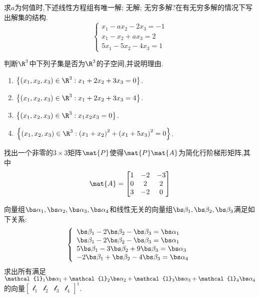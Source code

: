 \documentclass{ctexart}
\begin{document}
\pagestyle{empty}
\begin{center}
\end{center}
\begin{homework}[1(20')]
    求$a$为何值时,下述线性方程组有唯一解; 无解; 无穷多解?在有无穷多解的情况下写出解集的结构.
    \[\left\{\begin{array}{l}
        x_1-ax_2-2x_3=-1\\
        x_1-x_2+ax_3=2\\
        5x_1-5x_2-4x_3=1
    \end{array}\right.\]
\end{homework}
\begin{homework}[2(10')]
    判断$\R^3$中下列子集是否为$\R^3$的子空间,并说明理由.
    \begin{enumerate}[label=\tbf{(\arabic*)},topsep=0pt,parsep=0pt,itemsep=0pt,partopsep=0pt]
        \item $\left\{\left(x_1,x_2,x_3\right)\in\R^3:x_1+2x_2+3x_3=0\right\}$.
        \item $\left\{\left(x_1,x_2,x_3\right)\in\R^3:x_1+2x_2+3x_3=4\right\}$.
        \item $\left\{\left(x_1,x_2,x_3\right)\in\R^3:x_1x_2x_3=0\right\}$.
        \item $\left\{\left(x_1,x_2,x_3\right)\in\R^3:\left(x_1+x_2\right)^2+\left(x_1+5x_3\right)^2=0\right\}$.
    \end{enumerate}
\end{homework}
\begin{homework}[3(10')]
    找出一个非零的$3\times3$矩阵$\mat{P}$使得$\mat{P}\mat{A}$为简化行阶梯形矩阵,其中
    \[\mat{A}=\begin{bmatrix}
        1&-2&-3\\
        0&2&2\\
        3&-2&0
    \end{bmatrix}\]
\end{homework}
\begin{homework}[4(20')]
    向量组$\bs\alpha_1,\bs\alpha_2,\bs\alpha_3,\bs\alpha_4$和线性无关的向量组$\bs\beta_1,\bs\beta_2,\bs\beta_3$满足如下关系:
    \[\left\{\begin{array}{l}
        \bs\beta_1-2\bs\beta_2-\bs\beta_3=\bs\alpha_1\\
        \bs\beta_1-2\bs\beta_2-\bs\beta_3=\bs\alpha_1\\
        5\bs\beta_1-3\bs\beta_2+9\bs\beta_3=\bs\alpha_3\\
        -2\bs\beta_1+\bs\beta_2-4\bs\beta_3=\bs\alpha_4\\
    \end{array}\right.\]
    求出所有满足$\mathcal{l}_1\bs\alpha_1+\mathcal{l}_2\bs\alpha_2+\mathcal{l}_3\bs\alpha_3+\mathcal{l}_4\bs\alpha_4$的向量$\begin{bmatrix}
        \mathcal{l}_1&\mathcal{l}_2&\mathcal{l}_3&\mathcal{l}_4
    \end{bmatrix}^{\text{t}}$.
\end{homework}
\end{document}
